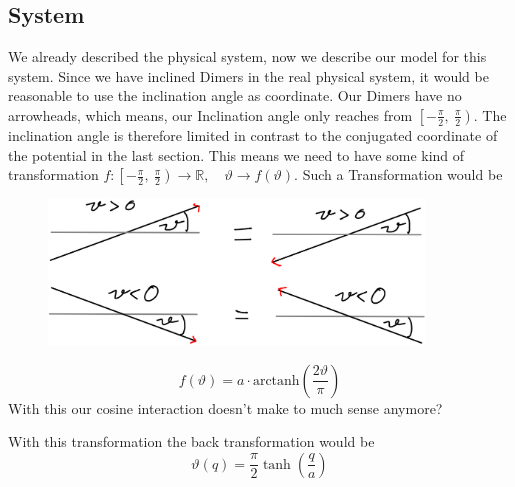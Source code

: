 	\subsection{System}
	We already described the physical system, now we describe our model for this system. Since we have inclined Dimers in the real physical system, it would be reasonable to use the inclination angle as coordinate. Our Dimers have no arrowheads, which means, our Inclination angle only reaches from $ \left[-\frac{\pi}{2}, ~\frac{\pi}{2}\right)$. The inclination angle is therefore limited in contrast to the conjugated coordinate of the potential in the last section. This means we need to have some kind of transformation $f:	\left[-\frac{\pi}{2}, ~\frac{\pi}{2}\right) \rightarrow \mathbb{R}, \quad \vartheta \rightarrow f(\vartheta)$. Such a Transformation would be
	\begin{figure}
		\centering
		\includegraphics[width=10cm]{graphics/coordinate.png}
	\end{figure}
	\begin{equation}
		f(\vartheta) =	a \cdot \text{arctanh}\left(\frac{2 \vartheta}{\pi}\right)
	\end{equation}
	With this our cosine interaction doesn't make to much sense anymore?
	
	With this transformation the back transformation would be
	\begin{equation}
		\vartheta(q) =	\frac{\pi}{2} \tanh\left(\frac{q}{a}\right)
	\end{equation}

